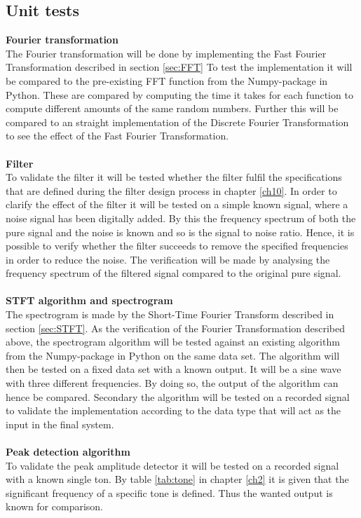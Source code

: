 \subsection{Unit tests} 
\textbf{Fourier transformation} \\
The Fourier transformation will be done by implementing the Fast Fourier Transformation described in section \ref{sec:FFT} 
To test the implementation it will be compared to the pre-existing FFT function from the Numpy-package in Python. These are compared by computing the time it takes for each function to compute different amounts of the same random numbers. Further this will be compared to an straight  implementation of the Discrete Fourier Transformation to see the effect of the Fast Fourier Transformation.\\
\\
\textbf{Filter}\\
To validate the filter it will be tested whether the filter fulfil the specifications that are defined during the filter design process in chapter \ref{ch10}. In order to clarify the effect of the filter it will be tested on a simple known signal, where a noise signal has been digitally added. By this the frequency spectrum of both the pure signal and the noise is known and so is the signal to noise ratio. Hence, it is possible to verify whether the filter succeeds to remove the specified frequencies in order to reduce the noise. The verification will be made by analysing the frequency spectrum of the filtered signal compared to the original pure signal. \\
\\
\textbf{STFT algorithm and spectrogram}\\
The spectrogram is made by the Short-Time Fourier Transform described in section \ref{sec:STFT}. As the verification of the Fourier Transformation described above, the spectrogram algorithm will be tested against an existing algorithm from the Numpy-package in Python on the same data set.
The algorithm will then be tested on a fixed data set with a known output. It will be a sine wave with three different frequencies. By doing so, the output of the algorithm can hence be compared.
Secondary the algorithm will be tested on a recorded signal to validate the implementation according to the data type that will act as the input in the final system. 
\\
\\
\textbf{Peak detection algorithm}\\
To validate the peak amplitude detector it will be tested on a recorded signal with a known single ton. By table \ref{tab:tone} in chapter \ref{ch2} it is given that the significant frequency of a specific tone is defined. Thus the wanted output is known for comparison.         

